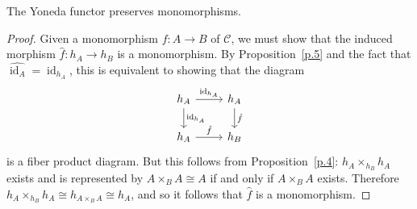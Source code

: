 \documentclass[dissertation.tex]{subfiles}
\begin{document}
\begin{cor}
  The Yoneda functor preserves monomorphisms.

  \begin{proof}
    Given a monomorphism $f \colon A \rightarrow B$ of $\mathscr{C}$, we must show that the induced morphism $\hat{f} \colon h_A \rightarrow h_B$ is a monomorphism.
    By Proposition~\ref{p.5} and the fact that $\hat{\operatorname{id}_A} = \operatorname{id}_{h_A}$, this is equivalent to showing that the diagram
    $$\begin{tikzcd}
      h_A \arrow{d}{\operatorname{id}_{h_A}}\arrow{r}{\operatorname{id}_{h_A}} & h_A\arrow{d}{\hat{f}}\\
    h_A \arrow{r}{\hat{f}} & h_B
  \end{tikzcd}$$
    is a fiber product diagram.
    But this follows from Proposition~\ref{p.4}: $h_A \times_{h_B} h_A$ exists and is represented by $A \times_B A \cong A$ if and only if $A \times_B A$ exists.
    Therefore $h_A \times_{h_B} h_A \cong h_{A \times_B A} \cong h_A$, and so it follows that $\hat{f}$ is a monomorphism.
  \end{proof}
\end{cor}
\end{document}
